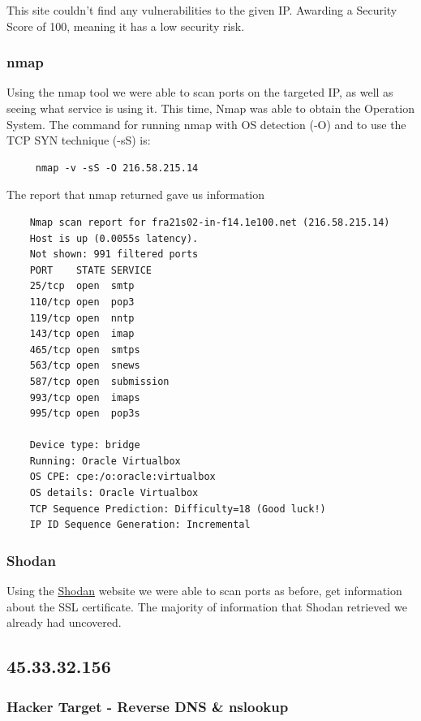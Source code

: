 This site couldn't find any vulnerabilities to the given IP. Awarding a Security Score of 100, meaning it has a low security risk.


\subsubsection{nmap}

Using the nmap tool we were able to scan ports on the targeted IP, as well as seeing what service is using it. This time, Nmap was able to obtain the Operation System. The command for running nmap with OS detection (-O) and to use the TCP SYN technique (-sS) is:

\begin{lstlisting}
     nmap -v -sS -O 216.58.215.14
\end{lstlisting}

The report that nmap returned gave us information

\begin{lstlisting}
    Nmap scan report for fra21s02-in-f14.1e100.net (216.58.215.14)
    Host is up (0.0055s latency).
    Not shown: 991 filtered ports
    PORT    STATE SERVICE
    25/tcp  open  smtp
    110/tcp open  pop3
    119/tcp open  nntp
    143/tcp open  imap
    465/tcp open  smtps
    563/tcp open  snews
    587/tcp open  submission
    993/tcp open  imaps
    995/tcp open  pop3s

    Device type: bridge
    Running: Oracle Virtualbox
    OS CPE: cpe:/o:oracle:virtualbox
    OS details: Oracle Virtualbox
    TCP Sequence Prediction: Difficulty=18 (Good luck!)
    IP ID Sequence Generation: Incremental
\end{lstlisting}
 
\subsubsection{Shodan}

Using the \href{https://www.shodan.io/host/216.58.215.148}{Shodan} website we were able to scan ports as before, get information about the SSL certificate. The majority of information that Shodan retrieved we already had uncovered.


\subsection{45.33.32.156}

\subsubsection{Hacker Target - Reverse DNS \& nslookup}

